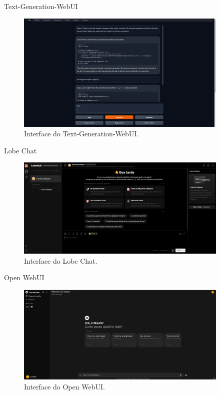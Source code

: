 \documentclass{beamer}
\begin{document}
\begin{frame}{Text-Generation-WebUI}
    \begin{figure}[!h]
    \centering
    \includegraphics[width=4.0in]{images/Text generation web UI.png}
    \caption{Interface do Text-Generation-WebUI.} 
    \label{fig:Text-Generation-WebUI}
    \end{figure}
\end{frame}

\begin{frame}{Lobe Chat}
    \begin{figure}[!h]
    \centering
    \includegraphics[width=4.0in]{images/Lobe HUB UI.png}
    \caption{Interface do Lobe Chat.} 
    \label{fig:Lobe Chat}
    \end{figure}
\end{frame}

\begin{frame}{Open WebUI}
    \begin{figure}[!h]
    \centering
    \includegraphics[width=4.0in]{images/OpenWebUi.png}
    \caption{Interface do Open WebUI.} 
    \label{fig:Open WebUI}
    \end{figure}
\end{frame}
\end{document}
